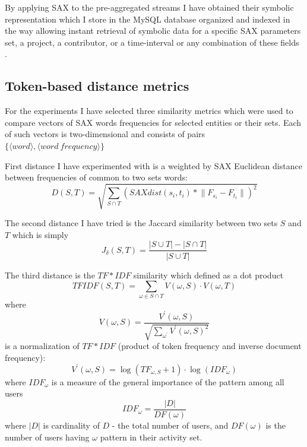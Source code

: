 \documentclass[10pt, conference, compsocconf]{IEEEtran}
\begin{document}
By applying SAX to the pre-aggregated streams I have obtained their symbolic representation
which I store in the MySQL database organized and indexed in the way allowing
instant retrieval of symbolic data for a specific SAX parameters set, a project, a contributor, 
or a time-interval or any combination of these fields .

\subsection{Token-based distance metrics}
For the experiments I have selected three similarity metrics which were used to compare 
vectors of SAX words frequencies for selected entities or their sets. Each of such vectors
is two-dimensional and consists of pairs $\{\langle word\rangle,\langle word \: frequency\rangle\}$

First distance I have experimented with is a weighted by SAX Euclidean 
distance between frequencies of common to two sets words:
\begin{equation}
D(S,T) = \sqrt{ \sum_{S\cap T} (SAXdist(s_{i},t_{i}) * \lVert F_{s_{i}}-F_{t_{i}} \rVert )^{2}  }
\end{equation} 

The second distance I have tried is the Jaccard similarity between two sets $S$ and $T$ which is simply 
\begin{equation}
J_{\delta}(S,T) = \frac{|S\cup T| - |S\cap T|}{|S\cup T|}
\end{equation} 

The third distance is the $TF\ast IDF$ similarity which defined as a dot product 
\begin{equation}
 TFIDF(S,T) = \sum_{\omega \in S \cap T} V(\omega, S) \cdot V(\omega, T)
\end{equation} 
where 
\begin{equation}
 V(\omega, S) = \frac { V^{\prime} (\omega,S) } { \sqrt{ \sum_{\omega^{\prime}} V^{\prime} (\omega,S)^{2}} }
\end{equation} 
is a normalization of $TF\ast IDF$ (product of token frequency and inverse document frequency):
\begin{equation}
 V^{\prime} (\omega,S) = \log(TF_{\omega, S} +1) \cdot \log(IDF_{\omega})
\end{equation} 
where $IDF_{\omega}$ is a measure of the general importance of the pattern among all users
\begin{equation}
 IDF_{\omega} = \frac{|D|}{DF(\omega)}
\end{equation} 
where $|D|$ is cardinality of $D$ - the total number of users, and $DF(\omega)$ is the number of users having $\omega$ pattern in their activity set.
\end{document}
